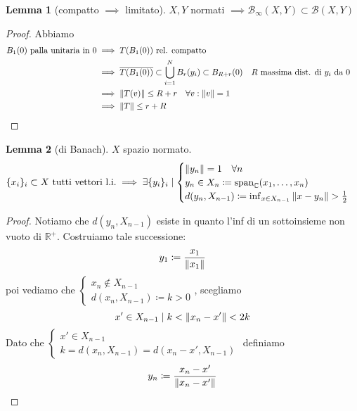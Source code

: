 \documentclass[a4paper,10pt]{article}
\theoremstyle{definition}
\newcommand{\re}{\mathbb{R}} %
\newcommand{\im}{\mathbb{C}} %
\theoremstyle{indentdefinition}
\theoremstyle{indenttheorem}
\newtheorem{lem*}{Lemma}
\theoremstyle{myremark}
\theoremstyle{indentgeneral}
\newenvironment{myboxed} 
{\noindent\begin{lrbox}{\mybox}\begin{minipage}{\textwidth}}
{\end{minipage}\end{lrbox}\fbox{\usebox{\mybox}}}
\begin{document}
\begin{myboxed}
    \begin{lem*}[compatto $\implies$ limitato]
        $X,Y$ normati $\implies \mathcal{B}_\infty(X,Y)\subset\mathcal{B}(X,Y)$ 
    \end{lem*}
\end{myboxed}
\begin{proof}
    Abbiamo
    \begin{align*}
        B_1(0) \text{ palla unitaria in 0} &\implies T(B_1(0)) \text{ rel. compatto}\\
        &\implies \overline{T(B_1(0)) }\subset \bigcup_{i=1}^NB_r(y_i)\subset B_{R+r}(0) && \text{$R$ massima dist. di $y_i$ da 0}\\
        &\implies \norm{T(v)}\le R+r \quad \forall v:\norm{v}=1\\
        &\implies \norm{T}\le r+R
    \end{align*}
\end{proof}

\begin{myboxed}
    \begin{lem*}[di Banach]\label{lem-banach}
        $X$ spazio normato.
        $$\{x_i\}_i\subset X \text{ tutti vettori l.i.}\implies \exists\{y_i\}_i\mid \begin{cases}
            \norm{y_n}=1\quad \forall n\\
            y_n\in X_n\coloneqq\text{span}_\im(x_1,\dots,x_n)\\
            d(y_n,X_{n-1})\coloneqq \inf_{x\in X_{n-1}}\norm{x-y_n}>\frac{1}{2}
        \end{cases} $$
    \end{lem*}
\end{myboxed}

\begin{proof}
    Notiamo che $ d(y_n,X_{n-1})$ esiste in quanto l'inf di un sottoinsieme non vuoto di $\re^+$. Costruiamo tale successione:
    $$y_1\coloneqq\frac{x_1}{\norm{x_1}}$$
    poi vediamo che $\begin{cases}
        x_n\notin X_{n-1}\\
        d(x_n,X_{n-1})\coloneqq k>0
    \end{cases}$, scegliamo $$x'\in X_{n-1}\mid k<\norm{x_n-x'}<2k$$
    Dato che $\begin{cases}
x'\in X_{n-1}   \\
k=d(x_n,X_{n-1})=d(x_n-x',X_{n-1})
    \end{cases}$  definiamo
    $$y_n\coloneqq\frac{x_n-x'}{\norm{x_n-x'}}$$
\end{proof}
\end{document}
